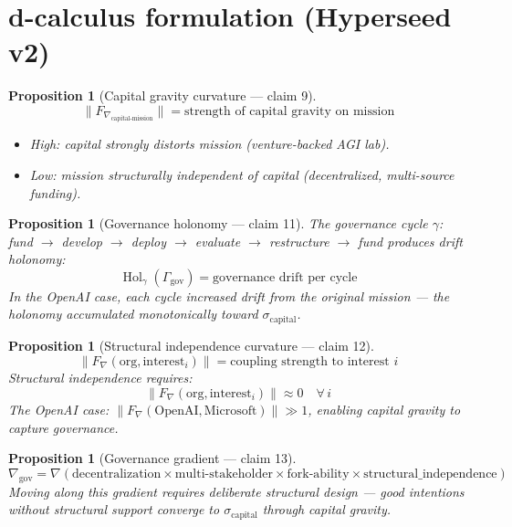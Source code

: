 \documentclass[11pt,a4paper]{article}
\newtheorem{proposition}[definition]{Proposition}
\begin{document}
\section{d-calculus formulation (Hyperseed v2)}

\begin{proposition}[Capital gravity curvature --- claim 9]
\label{prop:capital}
\[
  \|F_{\nabla_{\text{capital-mission}}}\| = \text{strength of capital
    gravity on mission}
\]
\begin{itemize}
  \item High: capital strongly distorts mission (venture-backed AGI lab).
  \item Low: mission structurally independent of capital (decentralized,
    multi-source funding).
\end{itemize}
\end{proposition}

\begin{proposition}[Governance holonomy --- claim 11]
\label{prop:holonomy}
The governance cycle $\gamma$: fund $\to$ develop $\to$ deploy $\to$
evaluate $\to$ restructure $\to$ fund produces drift holonomy:
\[
  \operatorname{Hol}_\gamma(\Gamma_{\text{gov}}) = \text{governance
    drift per cycle}
\]
In the OpenAI case, each cycle increased drift from the original
mission --- the holonomy accumulated monotonically toward
$\sigma_{\text{capital}}$.
\end{proposition}

\begin{proposition}[Structural independence curvature --- claim 12]
\label{prop:independence}
\[
  \|F_\nabla(\text{org}, \text{interest}_i)\| = \text{coupling
    strength to interest } i
\]
Structural independence requires:
\[
  \|F_\nabla(\text{org}, \text{interest}_i)\| \approx 0
  \quad \forall\, i
\]
The OpenAI case: $\|F_\nabla(\text{OpenAI}, \text{Microsoft})\| \gg 1$,
enabling capital gravity to capture governance.
\end{proposition}

\begin{proposition}[Governance gradient --- claim 13]
\label{prop:gradient}
\[
  \nabla_{\text{gov}} = \nabla\left(\text{decentralization} \times
    \text{multi-stakeholder} \times \text{fork-ability} \times
    \text{structural\_independence}\right)
\]
Moving along this gradient requires deliberate structural design ---
good intentions without structural support converge to
$\sigma_{\text{capital}}$ through capital gravity.
\end{proposition}
\end{document}
